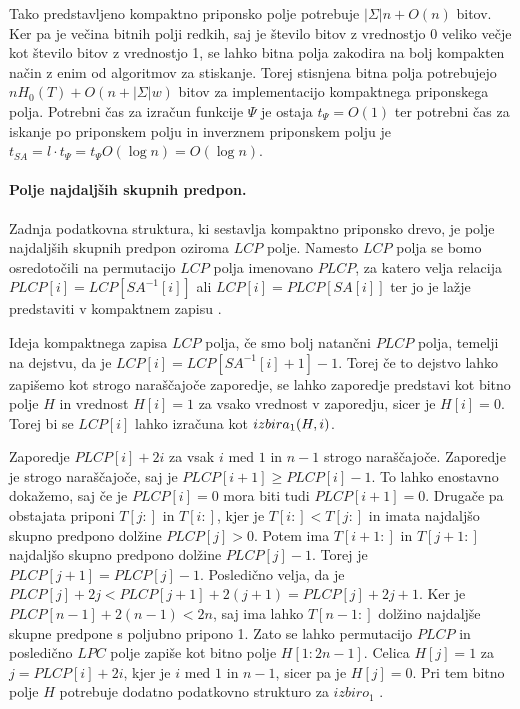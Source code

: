 Tako predstavljeno kompaktno priponsko polje potrebuje $|\Sigma|n + O(n)$ bitov. Ker pa je večina bitnih polji redkih, saj je število bitov z vrednostjo 0 veliko večje kot število bitov z vrednostjo 1, se lahko bitna polja zakodira na bolj kompakten način z enim od algoritmov za stiskanje. Torej stisnjena bitna polja potrebujejo $nH_0(T)+O(n+|\Sigma|w)$ bitov za implementacijo kompaktnega priponskega polja. Potrebni čas za izračun funkcije $\Psi$ je ostaja $t_\Psi=O(1)$ ter potrebni čas za iskanje po priponskem polju in inverznem priponskem polju je $t_{SA}=l\cdot t_\Psi = t_\Psi O(\log{n}) = O(\log{n})$.


\paragraph{Polje najdaljših skupnih predpon.}
Zadnja podatkovna struktura, ki sestavlja kompaktno priponsko drevo, je polje najdaljših skupnih predpon oziroma $LCP$ polje. Namesto $LCP$ polja se bomo osredotočili na permutacijo $LCP$ polja imenovano $PLCP$, za katero velja relacija $PLCP[i]=LCP[SA^{-1}[i]]$ ali $LCP[i]=PLCP[SA[i]]$ ter jo je lažje predstaviti v kompaktnem zapisu \cite{Navarro2016, Sadakane2007}.

Ideja kompaktnega zapisa $LCP$ polja, če smo bolj natančni $PLCP$ polja, temelji na dejstvu, da je $LCP[i]=LCP[SA^{-1}[i]+1]-1$. Torej če to dejstvo lahko zapišemo kot strogo naraščajoče zaporedje, se lahko zaporedje predstavi kot bitno polje $H$ in vrednost $H[i]=1$ za vsako vrednost v zaporedju, sicer je $H[i]=0$. Torej bi se $LCP[i]$ lahko izračuna kot $ \mathop{izbira}\nolimits_{1}(H,i)$.

Zaporedje $PLCP[i]+2i$ za vsak $i$ med $1$ in $n-1$ strogo naraščajoče. Zaporedje je strogo naraščajoče, saj je $PLCP[i+1]\ge PLCP[i]-1$. To lahko enostavno dokažemo, saj če je $PLCP[i]=0$ mora biti tudi $PLCP[i+1]=0$. Drugače pa obstajata priponi $T[j:]$ in $T[i:]$, kjer je $T[i:]<T[j:]$ in imata najdaljšo skupno predpono dolžine $PLCP[j]>0$. Potem ima $T[i+1:]$ in $T[j+1:]$ najdaljšo skupno predpono dolžine $PLCP[j]-1$. Torej je $PLCP[j+1] = PLCP[j]-1$. Posledično velja, da je $PLCP[j]+2j<PLCP[j+1]+2(j+1)= PLCP[j]+2j+1$. Ker je $PLCP[n-1]+2(n-1)< 2n$, saj ima lahko $T[n-1:]$ dolžino najdaljše skupne predpone s poljubno pripono 1. Zato se lahko permutacijo $PLCP$ in posledično $LPC$ polje zapiše kot bitno polje $H[1:2n-1]$. Celica $H[j]=1$ za $j=PLCP[i]+2i$, kjer je $i$ med $1$ in $n-1$, sicer pa je $H[j]=0$. Pri tem bitno polje $H$ potrebuje dodatno podatkovno strukturo za $izbiro_1$ \cite{Navarro2016, Sadakane2007}.

